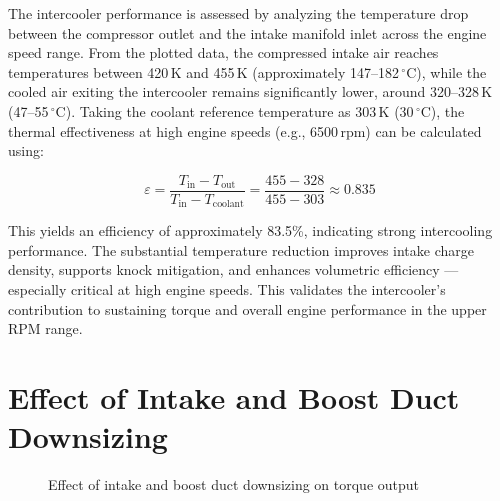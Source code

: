 The intercooler performance is assessed by analyzing the temperature drop between the compressor outlet and the intake manifold inlet across the engine speed range. From the plotted data, the compressed intake air reaches temperatures between 420\,K and 455\,K (approximately 147–182\,$^\circ$C), while the cooled air exiting the intercooler remains significantly lower, around 320–328\,K (47–55\,$^\circ$C). Taking the coolant reference temperature as 303\,K (30\,$^\circ$C), the thermal effectiveness at high engine speeds (e.g., 6500\,rpm) can be calculated using:

\[
\varepsilon = \frac{T_{\text{in}} - T_{\text{out}}}{T_{\text{in}} - T_{\text{coolant}}} = \frac{455 - 328}{455 - 303} \approx 0.835
\]

This yields an efficiency of approximately 83.5\%, indicating strong intercooling performance. The substantial temperature reduction improves intake charge density, supports knock mitigation, and enhances volumetric efficiency — especially critical at high engine speeds. This validates the intercooler's contribution to sustaining torque and overall engine performance in the upper RPM range.



\section{Effect of Intake and Boost Duct Downsizing}

\begin{figure}[H]
  \centering
  \caption{Effect of intake and boost duct downsizing on torque output}
  \label{fig:task3_downsizing_effect}
\end{figure}

